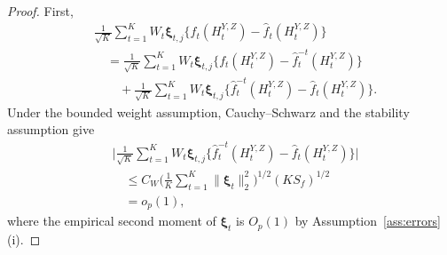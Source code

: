 \documentclass[12pt]{article}
\numberwithin{equation}{section}
\begin{document}
\begin{proof}
First,
\begin{align*}
&\frac1{\sqrt K}\sum_{t=1}^K W_t\boldsymbol\xi_{t,j}
\big\{f_t(H_t^{Y,Z})-\hat f_t(H_t^{Y,Z})\big\}\\
&\quad=\frac1{\sqrt K}\sum_{t=1}^K W_t\boldsymbol\xi_{t,j}
\big\{f_t(H_t^{Y,Z})-\hat f_t^{-t}(H_t^{Y,Z})\big\}\\
&\qquad{}+\frac1{\sqrt K}\sum_{t=1}^K W_t\boldsymbol\xi_{t,j}
\big\{\hat f_t^{-t}(H_t^{Y,Z})-\hat f_t(H_t^{Y,Z})\big\}.
\end{align*}
Under the bounded weight assumption, Cauchy--Schwarz and
the stability assumption give
\begin{equation}
\label{eq:outcome-first-deletion-bound}
\begin{aligned}
&\Big|\frac1{\sqrt K}\sum_{t=1}^K W_t\boldsymbol\xi_{t,j}
\big\{\hat f_t^{-t}(H_t^{Y,Z})-\hat f_t(H_t^{Y,Z})\big\}\Big|\\
&\quad\leq C_W
\Big(\frac1K\sum_{t=1}^K\|\boldsymbol\xi_t\|_2^2\Big)^{1/2}
(KS_f)^{1/2}\\
&\quad=o_p(1),
\end{aligned}
\end{equation}
where the empirical second moment of \(\boldsymbol\xi_t\) is
\(O_p(1)\) by Assumption~\ref{ass:errors}(i).


\end{proof}
\end{document}
